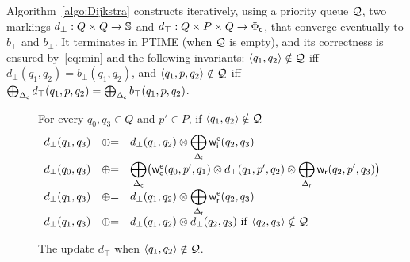 Algorithm~\ref{algo:Dijkstra} constructs iteratively, using a priority queue $\mathcal{Q}$, 
two markings
$d_\bot : Q \times Q \to \mathbb{S}$ and
$d_\top : Q \times P \times Q \to {\Phi_\mathsf{c}}$,
that converge eventually to $b_\top$ and $b_\bot$. 
%
%
%
%
It terminates in PTIME (when $\mathcal{Q}$ is empty), 
and its correctness is ensured by~\eqref{eq:min} and  
the following invariants: 
$\< q_1, q_2> \notin \Q$ iff $d_\bot(q_1, q_2) = b_\bot(q_1, q_2)$, 
and $\< q_1, p, q_2> \notin \Q$ iff 
$\bigoplus_{{\Delta_\mathsf{c}}} d_\top(q_1, p, q_2) = \bigoplus_{{\Delta_\mathsf{c}}} b_\top(q_1, p, q_2)$.

\begin{figure}[ht]
For every $q_0, q_3 \in Q$ and $p' \in P$, if $\< q_1, q_2> \notin \Q$ 
\[
\begin{array}{lcl}
%
d_\bot(q_1, q_3) & \opluseq &
  d_\bot(q_1, q_2) \otimes
  \displaystyle\bigoplus_{\Deltai} \weiei(q_2, q_3)\\
%
d_\bot(q_0, q_3) & \opluseq &
  {\displaystyle\bigoplus_{\Deltac}}
  \bigl(
  \weiec(q_0, p', q_1) \otimes
   d_\top(q_1, p', q_2) \otimes
  \displaystyle\bigoplus_{\Deltar} \weir(q_2, p', q_3)\bigr)\\
%
d_\bot(q_1, q_3) & \opluseq &
  d_\bot(q_1, q_2) \otimes
  \displaystyle\bigoplus_{\Deltar} \weier(q_2, q_3)\\
%
d_\bot(q_1, q_3) & \opluseq &
  d_\bot(q_1, q_2) \otimes d_\bot(q_2, q_3)\  \mathrm{if~} \< q_2, q_3> \notin \Q \\
\end{array}
\]
\caption{The update $d_\top$ when $\< q_1, q_2> \notin \Q$.}
\label{fig:best-update-bottom}
\end{figure}
%

